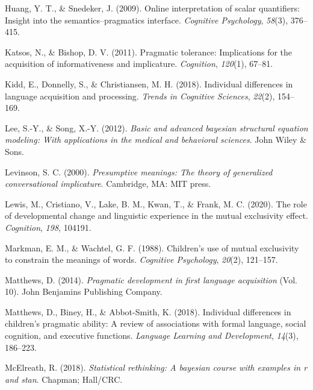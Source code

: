 \documentclass[
  man,floatsintext]{apa6}
\newlength{\cslhangindent}
\newlength{\cslentryspacingunit} %
\newenvironment{CSLReferences}[2] %
 {%
  \setlength{\parindent}{0pt}
  \ifodd #1
  \let\oldpar\par
  \def\par{\hangindent=\cslhangindent\oldpar}
  \fi
  \setlength{\parskip}{#2\cslentryspacingunit}
 }%
 {}
\begin{document}
\begin{CSLReferences}{1}{0}
\leavevmode{}%
Huang, Y. T., \& Snedeker, J. (2009). Online interpretation of scalar quantifiers: Insight into the semantics--pragmatics interface. \emph{Cognitive Psychology}, \emph{58}(3), 376--415.

\leavevmode{}%
Katsos, N., \& Bishop, D. V. (2011). Pragmatic tolerance: Implications for the acquisition of informativeness and implicature. \emph{Cognition}, \emph{120}(1), 67--81.

\leavevmode{}%
Kidd, E., Donnelly, S., \& Christiansen, M. H. (2018). Individual differences in language acquisition and processing. \emph{Trends in Cognitive Sciences}, \emph{22}(2), 154--169.

\leavevmode{}%
Lee, S.-Y., \& Song, X.-Y. (2012). \emph{Basic and advanced bayesian structural equation modeling: With applications in the medical and behavioral sciences}. John Wiley \& Sons.

\leavevmode{}%
Levinson, S. C. (2000). \emph{Presumptive meanings: The theory of generalized conversational implicature}. Cambridge, MA: MIT press.

\leavevmode{}%
Lewis, M., Cristiano, V., Lake, B. M., Kwan, T., \& Frank, M. C. (2020). The role of developmental change and linguistic experience in the mutual exclusivity effect. \emph{Cognition}, \emph{198}, 104191.

\leavevmode{}%
Markman, E. M., \& Wachtel, G. F. (1988). Children's use of mutual exclusivity to constrain the meanings of words. \emph{Cognitive Psychology}, \emph{20}(2), 121--157.

\leavevmode{}%
Matthews, D. (2014). \emph{Pragmatic development in first language acquisition} (Vol. 10). John Benjamins Publishing Company.

\leavevmode{}%
Matthews, D., Biney, H., \& Abbot-Smith, K. (2018). Individual differences in children's pragmatic ability: A review of associations with formal language, social cognition, and executive functions. \emph{Language Learning and Development}, \emph{14}(3), 186--223.

\leavevmode{}%
McElreath, R. (2018). \emph{Statistical rethinking: A bayesian course with examples in r and stan}. Chapman; Hall/CRC.


\end{CSLReferences}
\end{document}
